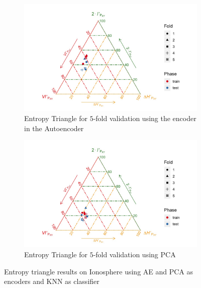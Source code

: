 \begin{figure}[H]
\begin{subfigure}{\textwidth}  
	\centering
	\includegraphics[width=\linewidth]{Figuras_tfg/ET_Iono_Auto_Knn}
	\caption{Entropy Triangle for $5$-fold validation using the encoder in the Autoencoder}
	\label{fig:figure_Knn_Iono_ET_Auto}
\end{subfigure}

\begin{subfigure}{\textwidth}  
	\centering
	\includegraphics[width=\linewidth]{Figuras_tfg/ET_Iono_PCA_Knn}
	\caption{Entropy Triangle for $5$-fold validation using PCA}
	\label{fig:figure_Knn_Iono_ET_PCA}
\end{subfigure}

\caption{Entropy triangle results on Ionosphere using AE and PCA as encoders and KNN as classifier}
\label{fig:figure_Knn_Iono}
\end{figure}

